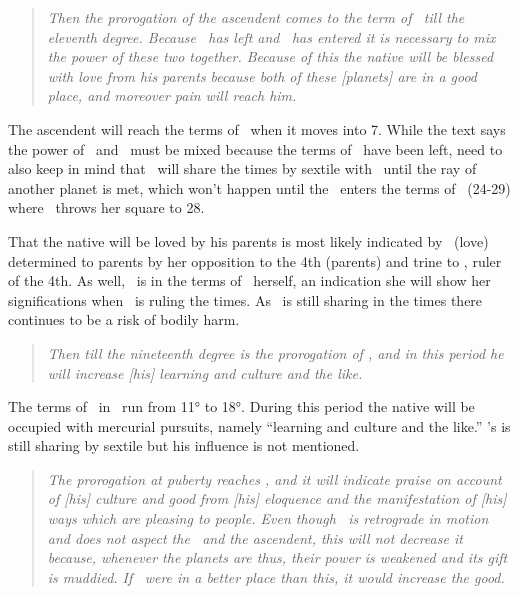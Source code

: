 \begin{quote}
\textsl{Then the prorogation of the ascendent comes to the term of \Venus\, till the eleventh degree. Because \Mars\, has left and \Venus\, has entered it is necessary to mix the power of these two together. Because of this the native will be blessed with love from his parents because both of these [planets] are in a good place, and moreover pain will reach him.}
\end{quote}

The ascendent will reach the terms of \Venus\, when it moves into 7\Scorpio. While the text says the power of \Mars\, and \Venus\, must be mixed because the terms of \Mars\, have been left, need to also keep in mind that \Mars\, will share the times by sextile with \Venus\, until the ray of another planet is met, which won't happen until the \ASC\, enters the terms of \Saturn\, (24-29\Scorpio) where \Venus\, throws her square to 28\Scorpio.

That the native will be loved by his parents is most likely indicated by \Venus\, (love) determined to parents by her opposition to the 4th (parents) and trine to \Saturn, ruler of the 4th. As well, \Venus\, is in the terms of \Mars\, herself, an indication she will show her significations when \Mars\, is ruling the times. As \Mars\, is still sharing in the times there continues to be a risk of bodily harm. 

\begin{quote}
\textsl{Then till the nineteenth degree is the prorogation of \Mercury, and in this period he will increase [his] learning and culture and the like.}
\end{quote}

The terms of \Mercury\, in \Scorpio\, run from 11° to 18°. During this period the native will be occupied with mercurial pursuits, namely ``learning and culture and the like.'' \Mars's is still sharing by sextile but his influence is not mentioned.

\begin{quote}
\textsl{The prorogation at puberty reaches \Jupiter, and it will indicate praise on account of [his] culture and good from [his] eloquence and the manifestation of [his] ways which are pleasing to people. Even though \Jupiter\, is retrograde in motion and does not aspect the \Moon\, and the ascendent, this will not decrease it because, whenever the planets are thus, their power is weakened and its gift is muddied. If \Jupiter\, were in a better place than this, it would increase the good.}
\end{quote}

